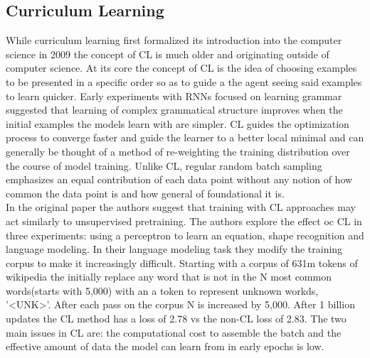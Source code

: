 \subsection{Curriculum Learning}
While curriculum learning first formalized its introduction into the computer science in 2009 \cite{Bengio2009CurriculumL} the concept of CL is much older and originating outside of computer science. At its core the concept of CL is the idea of choosing examples to be presented in a specific order so as to guide a the agent seeing said examples to learn quicker. Early experiments \cite{Elman1993LearningAD} with RNNs focused on learning grammar suggested that learning of complex grammatical structure improves when the initial examples the models learn with are simpler. CL guides the optimization process to converge faster and guide the learner to a better local minimal and can generally be thought of a method of re-weighting the training distribution over the course of model training. Unlike CL, regular random batch sampling emphasizes an equal contribution of each data point without any notion of how common the data point is and how general of foundational it is.\\
In the original paper the authors suggest that training with CL approaches may act similarly to  unsupervised pretraining. The authors explore the effect oc CL in three experiments: using a perceptron to learn an equation, shape recognition and language modeling. In their language modeling task they modify the training corpus to make it increasingly difficult. Starting with a corpus of 631m tokens of wikipedia the initially replace any word that is not in the N most common words(starts with 5,000) with an a token to represent unknown workds, '<UNK>'. After each pass on the corpus N is increased by 5,000. After 1 billion updates the CL method has a loss of 2.78 vs the non-CL loss of 2.83. The two main issues in CL are: the computational cost to assemble the batch and the effective amount of data the model can learn from in early epochs is low. \\
